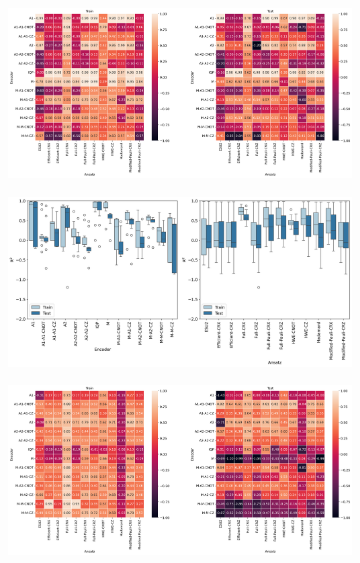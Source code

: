 \documentclass[journal=jacsat,manuscript=article]{achemso}
\begin{document}
\begin{figure}[H]
	\centering
	\begin{subfigure}[b]{0.49\textwidth}
		\centering
		\includegraphics[width=\textwidth]{../images/Function_Fitting/fivequbit/linear_heatplots.png}
		\caption{}
		\label{fig:linear_heatplots}
	\end{subfigure}
	\hfill
	\begin{subfigure}[b]{0.49\textwidth}
		\centering
		\includegraphics[width=\textwidth]{../images/Function_Fitting/fivequbit/linear_boxplots.png}
		\caption{}
		\label{fig:linear_boxplots}
	\end{subfigure}
	\hfill	
	\begin{subfigure}[b]{0.49\textwidth}
		\centering
		\includegraphics[width=\textwidth]{../images/Function_Fitting/fivequbit/quadratic_heatplots.png}

\end{subfigure}
\end{figure}
\end{document}
